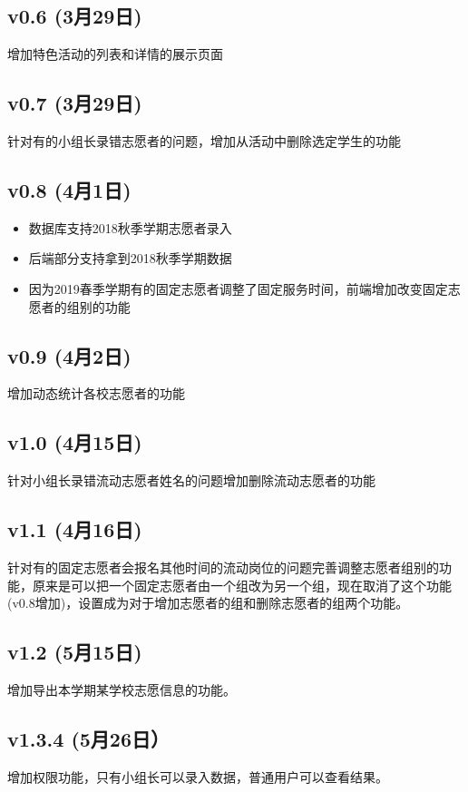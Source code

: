 \documentclass[]{ctexart}
\begin{document}
\hypertarget{v0.6-3ux670829ux65e5}{%
\subsection{v0.6 (3月29日)}\label{v0.6-3ux670829ux65e5}}

增加特色活动的列表和详情的展示页面

\hypertarget{v0.7-3ux670829ux65e5}{%
\subsection{v0.7 (3月29日)}\label{v0.7-3ux670829ux65e5}}

针对有的小组长录错志愿者的问题，增加从活动中删除选定学生的功能

\hypertarget{v0.8-4ux67081ux65e5}{%
\subsection{v0.8 (4月1日)}\label{v0.8-4ux67081ux65e5}}

\begin{itemize}
\item
  数据库支持2018秋季学期志愿者录入
\item
  后端部分支持拿到2018秋季学期数据
\item
  因为2019春季学期有的固定志愿者调整了固定服务时间，前端增加改变固定志愿者的组别的功能
\end{itemize}

\hypertarget{v0.9-4ux67082ux65e5}{%
\subsection{v0.9 (4月2日)}\label{v0.9-4ux67082ux65e5}}

增加动态统计各校志愿者的功能
\hypertarget{v1.0-4ux670815ux65e5}{%
\subsection{v1.0 (4月15日)}\label{v1.0-4ux670815ux65e5}}

针对小组长录错流动志愿者姓名的问题增加删除流动志愿者的功能

\hypertarget{v1.1-4ux670816ux65e5}{%
\subsection{v1.1 (4月16日)}\label{v1.1-4ux670816ux65e5}}

针对有的固定志愿者会报名其他时间的流动岗位的问题完善调整志愿者组别的功能，原来是可以把一个固定志愿者由一个组改为另一个组，现在取消了这个功能(v0.8增加)，设置成为对于增加志愿者的组和删除志愿者的组两个功能。

\hypertarget{v1.2-5ux670815ux65e5}{%
\subsection{v1.2 (5月15日)}\label{v1.2-5ux670815ux65e5}}

增加导出本学期某学校志愿信息的功能。

\hypertarget{v1.3.4-5ux670826ux65e5}{%
\subsection{v1.3.4 (5月26日）}\label{v1.3.4-5ux670826ux65e5}}

增加权限功能，只有小组长可以录入数据，普通用户可以查看结果。
\end{document}
